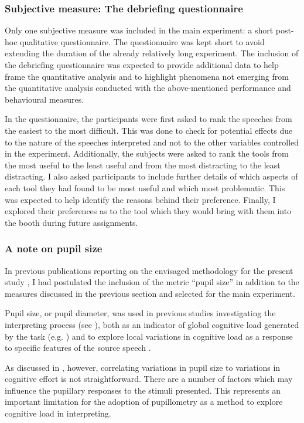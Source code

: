 \subsubsection{Subjective measure: The debriefing questionnaire} \label{subjectivem}
Only one subjective measure was included in the main experiment: a short post-hoc qualitative questionnaire. The questionnaire was kept short to avoid extending the duration of the already relatively long experiment. The inclusion of the debriefing questionnaire was expected to provide additional data to help frame the quantitative analysis and to highlight phenomena not emerging from the quantitative analysis conducted with the above-mentioned performance and behavioural measures.

In the questionnaire, the participants were first asked to rank the speeches from the easiest to the most difficult. This was done to check for potential effects due to the nature of the speeches interpreted and not to the other variables controlled in the experiment. Additionally, the subjects were asked to rank the tools from the most useful to the least useful and from the most distracting to the least distracting. I also asked participants to include further details of which aspects of each tool they had found to be most useful and which most problematic. This was expected to help identify the reasons behind their preference. Finally, I explored their preferences as to the tool which they would bring with them into the booth during future assignments.

\subsubsection{A note on pupil size} \label{physiologicalm}
In previous publications reporting on the envisaged methodology for the present study \citet{prandi_designing_2017,prandi_exploratory_2018}, I had postulated the inclusion of the metric ``pupil size'' in addition to the measures discussed in the previous section and selected for the main experiment.

Pupil size, or pupil diameter, was used in previous studies investigating the interpreting process (see ), both as an indicator of global cognitive load generated by the task (e.g. \citealt{hyona_pupil_1995}) and to explore local variations in cognitive load as a response to specific features of the source speech \citep{seeber_cognitive_2012}.

As discussed in , however, correlating variations in pupil size to variations in cognitive effort is not straightforward. There are a number of factors which may influence the pupillary responses to the stimuli presented. This represents an important limitation for the adoption of pupillometry as a method to explore cognitive load in interpreting.

